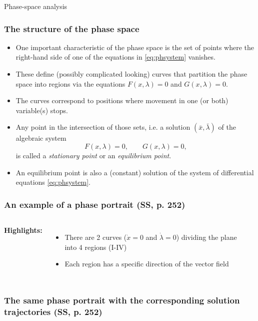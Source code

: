 \documentclass[10pt]{beamer}
\theoremstyle{definition}
\begin{document}
\begin{section}{Phase-space analysis}
\begin{frame}[fragile]
\frametitle{The structure of the phase space}
\begin{itemize}\itemsep1em
\item One important characteristic of the phase space is the set of points where the right-hand side of one of the equations in \eqref{eq:phsystem} vanishes.
\item These define (possibly complicated looking) curves that partition the phase space into regions via the equations $ F(x,\lambda)=0 $ and $ G(x,\lambda)=0 $. 
\item The curves correspond to positions where movement in one (or both) variable(s) stops.
\item Any point in the intersection of those sets, i.e. a solution $ (\bar{x},\bar{\lambda}) $ of the algebraic system \[ F(x,\lambda)=0,\qquad G(x,\lambda)=0, \] is called a \emph{stationary point} or an \emph{equilibrium point}.
\item An equilibrium point is also a (constant) solution of the system of differential equations \eqref{eq:phsystem}.
\end{itemize}
\end{frame}

\begin{frame}[fragile]
\frametitle{An example of a phase portrait (SS, p. 252)}
\begin{columns}
\textbf{Highlights:}
\begin{itemize}\itemsep1em
\item There are 2 curves ($ \dot{x}=0 $ and $ \dot{\lambda}=0 $) dividing the plane into 4 regions (I-IV)
\item Each region has a specific direction of the vector field
\end{itemize}
\begin{center}

\end{center}
\end{columns}
\end{frame}

\begin{frame}[fragile]
\frametitle{The same phase portrait with the corresponding solution trajectories (SS, p. 252)}
\begin{center}

\end{center}
\end{frame}


\end{section}
\end{document}
